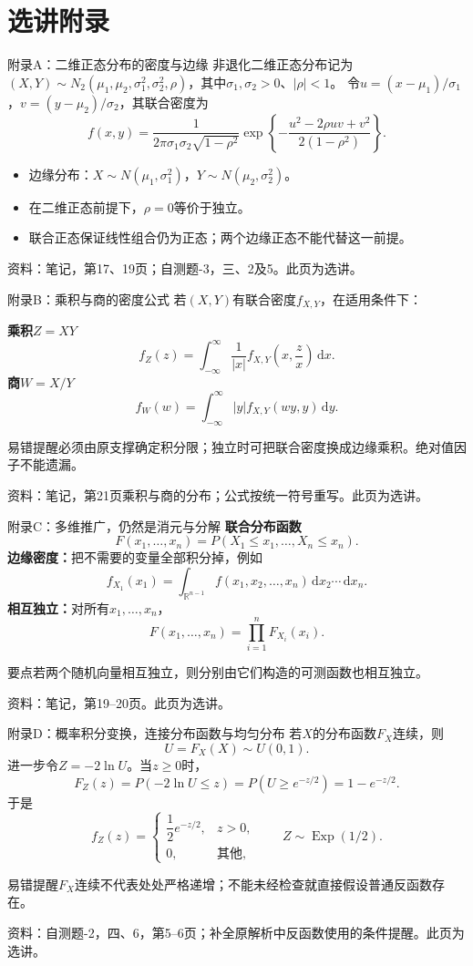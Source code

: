 \documentclass[aspectratio=169,10pt]{beamer}
\newcommand{\dd}{\,\mathrm{d}}
\newcommand{\R}{\mathbb{R}}
\DeclareMathOperator{\Exp}{Exp}
\newcommand{\source}[1]{\vfill{\color{Muted}\fontsize{6.5}{8}\selectfont 资料：#1\par}}
\newcommand{\key}[1]{\begin{block}{要点}#1\end{block}}
\newcommand{\warn}[1]{\begin{alertblock}{易错提醒}#1\end{alertblock}}
\begin{document}
\appendix
\section{选讲附录}
\begin{frame}[t]{附录A：二维正态分布的密度与边缘}
非退化二维正态分布记为
$(X,Y)\sim N_2(\mu_1,\mu_2,\sigma_1^2,\sigma_2^2,\rho)$，其中$\sigma_1,\sigma_2>0$、$|\rho|<1$。
令$u=(x-\mu_1)/\sigma_1$，$v=(y-\mu_2)/\sigma_2$，其联合密度为
\[
f(x,y)=\frac1{2\pi\sigma_1\sigma_2\sqrt{1-\rho^2}}
\exp\!\left\{-\frac{u^2-2\rho uv+v^2}{2(1-\rho^2)}\right\}.
\]
\begin{itemize}
\item 边缘分布：$X\sim N(\mu_1,\sigma_1^2)$，$Y\sim N(\mu_2,\sigma_2^2)$。
\item 在二维正态前提下，$\rho=0$等价于独立。
\item 联合正态保证线性组合仍为正态；两个边缘正态不能代替这一前提。
\end{itemize}
\source{笔记，第17、19页；自测题-3，三、2及5。此页为选讲。}
\end{frame}

\begin{frame}[t]{附录B：乘积与商的密度公式}
若$(X,Y)$有联合密度$f_{X,Y}$，在适用条件下：\par
\textbf{乘积$Z=XY$}
\[
\boxed{f_Z(z)=\int_{-\infty}^{\infty}\frac1{|x|}f_{X,Y}\!\left(x,\frac z x\right)\dd x}.
\]
\textbf{商$W=X/Y$}
\[
\boxed{f_W(w)=\int_{-\infty}^{\infty}|y|f_{X,Y}(wy,y)\dd y}.
\]
\warn{必须由原支撑确定积分限；独立时可把联合密度换成边缘乘积。绝对值因子不能遗漏。}
\source{笔记，第21页乘积与商的分布；公式按统一符号重写。此页为选讲。}
\end{frame}

\begin{frame}[t]{附录C：多维推广，仍然是消元与分解}
\textbf{联合分布函数}
\[
F(x_1,\ldots,x_n)=P(X_1\le x_1,\ldots,X_n\le x_n).
\]
\textbf{边缘密度：}把不需要的变量全部积分掉，例如
\[
f_{X_1}(x_1)=\int_{\R^{n-1}}f(x_1,x_2,\ldots,x_n)\dd x_2\cdots\dd x_n.
\]
\textbf{相互独立：}对所有$x_1,\ldots,x_n$，
\[
F(x_1,\ldots,x_n)=\prod_{i=1}^nF_{X_i}(x_i).
\]
\key{若两个随机向量相互独立，则分别由它们构造的可测函数也相互独立。}
\source{笔记，第19--20页。此页为选讲。}
\end{frame}

\begin{frame}[t]{附录D：概率积分变换，连接分布函数与均匀分布}
若$X$的分布函数$F_X$连续，则
\[
\boxed{U=F_X(X)\sim U(0,1)}.
\]
进一步令$Z=-2\ln U$。当$z\ge0$时，
\[
F_Z(z)=P(-2\ln U\le z)=P(U\ge e^{-z/2})=1-e^{-z/2}.
\]
于是
\[
f_Z(z)=\begin{cases}\dfrac12e^{-z/2},&z>0,\\0,&\text{其他},\end{cases}
\qquad Z\sim\Exp(1/2).
\]
\warn{$F_X$连续不代表处处严格递增；不能未经检查就直接假设普通反函数存在。}
\source{自测题-2，四、6，第5--6页；补全原解析中反函数使用的条件提醒。此页为选讲。}
\end{frame}
\end{document}

